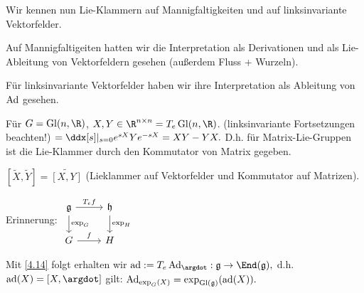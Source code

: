 \begin{nt*}
    Wir kennen nun Lie-Klammern auf Mannigfaltigkeiten und auf linksinvariante Vektorfelder.

    Auf Mannigfaltigeiten hatten wir die Interpretation als Derivationen und als Lie-Ableitung von Vektorfeldern gesehen (außerdem Fluss + Wurzeln).

    Für linksinvariante Vektorfelder haben wir ihre Interpretation als Ableitung von $\operatorname{Ad}$ gesehen.
\end{nt*}

\begin{ex*}
    Für $G = \Gl(n, \R)$, $X, Y \in \R^{n\times n} = T_e \Gl(n,\R)$.
    (linksinvariante Fortsetzungen beachten!)
    \begin{math}
        [X, Y] = \ddx[s]|_{s=0} e^{sX} Y e^{-sX}
        = XY - YX.
    \end{math}
    D.h. für Matrix-Lie-Gruppen ist die Lie-Klammer durch den Kommutator von Matrix gegeben.

    $[\tilde X, \tilde Y] = \widetilde{[X, Y]}$ (Lieklammer auf Vektorfelder und Kommutator auf Matrizen).
\end{ex*}

Erinnerung:
\begin{math}
    \begin{tikzcd}
        \frk g \ar[r,"T_e f"] \ar[d,"\exp_G"] & \frk h \ar[d,"\exp_H"] \\
        G \ar[r,"f"] & H
    \end{tikzcd}
\end{math}

\begin{kor} \label{4.21}
    Mit \ref{4.14} folgt erhalten wir
    \begin{math}
        \ad := T_e \Ad_{\argdot} : \frk g \to \End(\frk g),
    \end{math}
    d.h. $\ad(X) = [X,\argdot]$ gilt:
    \begin{math}
        \operatorname{Ad}_{\exp_G(X)} = \exp_{\operatorname{Gl}(\mathfrak{g})}(\operatorname{ad}(X)).
    \end{math}
\end{kor}

